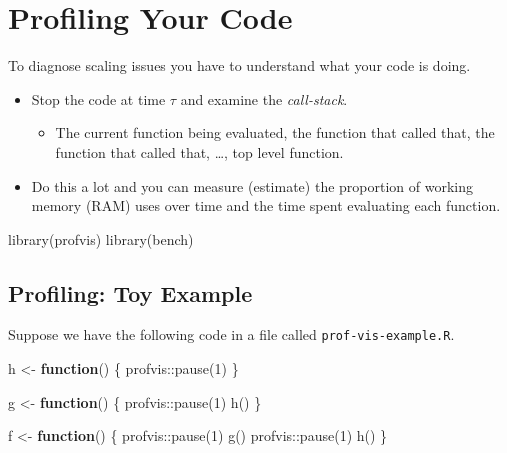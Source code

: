 \documentclass[
  12pt,
]{book}
\newenvironment{Shaded}{\begin{snugshade}}{\end{snugshade}}
\newcommand{\ControlFlowTok}[1]{\textcolor[rgb]{0.13,0.29,0.53}{\textbf{#1}}}
\newcommand{\DecValTok}[1]{\textcolor[rgb]{0.00,0.00,0.81}{#1}}
\newcommand{\FunctionTok}[1]{\textcolor[rgb]{0.00,0.00,0.00}{#1}}
\newcommand{\NormalTok}[1]{#1}
\newcommand{\OtherTok}[1]{\textcolor[rgb]{0.56,0.35,0.01}{#1}}
\newcommand{\SpecialCharTok}[1]{\textcolor[rgb]{0.00,0.00,0.00}{#1}}
\providecommand{\tightlist}{%
  \setlength{\itemsep}{0pt}\setlength{\parskip}{0pt}}
\begin{document}
\hypertarget{profiling-your-code}{%
\section{Profiling Your Code}\label{profiling-your-code}}

To diagnose scaling issues you have to understand what your code is doing.

\begin{itemize}
\item
  Stop the code at time \(\tau\) and examine the \emph{call-stack}.

  \begin{itemize}
  \tightlist
  \item
    The current function being evaluated, the function that called that, the function that called that, \ldots, top level function.
  \end{itemize}
\item
  Do this a lot and you can measure (estimate) the proportion of working memory (RAM) uses over time and the time spent evaluating each function.
\end{itemize}

\begin{Shaded}
\begin{Highlighting}[]
\FunctionTok{library}\NormalTok{(profvis)}
\FunctionTok{library}\NormalTok{(bench)}
\end{Highlighting}
\end{Shaded}

\hypertarget{profiling-toy-example}{%
\subsection{Profiling: Toy Example}\label{profiling-toy-example}}

Suppose we have the following code in a file called \texttt{prof-vis-example.R}.

\begin{Shaded}
\begin{Highlighting}[]

\NormalTok{h }\OtherTok{\textless{}{-}} \ControlFlowTok{function}\NormalTok{() \{}
\NormalTok{  profvis}\SpecialCharTok{::}\FunctionTok{pause}\NormalTok{(}\DecValTok{1}\NormalTok{)}
\NormalTok{\}}

\NormalTok{g }\OtherTok{\textless{}{-}} \ControlFlowTok{function}\NormalTok{() \{}
\NormalTok{  profvis}\SpecialCharTok{::}\FunctionTok{pause}\NormalTok{(}\DecValTok{1}\NormalTok{)}
  \FunctionTok{h}\NormalTok{()}
\NormalTok{\}}

\NormalTok{f }\OtherTok{\textless{}{-}} \ControlFlowTok{function}\NormalTok{() \{}
\NormalTok{  profvis}\SpecialCharTok{::}\FunctionTok{pause}\NormalTok{(}\DecValTok{1}\NormalTok{)}
  \FunctionTok{g}\NormalTok{()}
\NormalTok{  profvis}\SpecialCharTok{::}\FunctionTok{pause}\NormalTok{(}\DecValTok{1}\NormalTok{)}
  \FunctionTok{h}\NormalTok{()}
\NormalTok{\}}
\end{Highlighting}
\end{Shaded}
\end{document}
